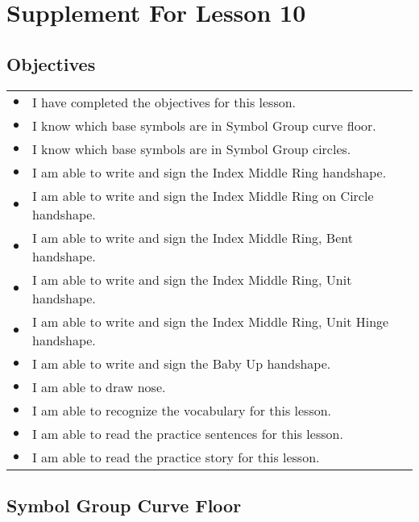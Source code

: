 \documentclass{article}
\begin{document}
\newfontfamily{}
\newfontfamily{}
\newcommand{\bul}{\hfil$\bullet$&}
\renewenvironment{glossary}{\begin{multicols}{5}\begin{center}}{\end{center}\end{multicols}}
\setcounter{secnumdepth}{0}
\setlength{\columnseprule}{1pt}

\section{Supplement For Lesson 10}

\subsection{Objectives}

\begin{tabular}{p{1cm}p{14cm}}
\bul I have completed the objectives for this lesson.\\
\bul I know which base symbols are in Symbol Group curve floor.\\
\bul I know which base symbols are in Symbol Group circles.\\
\bul I am able to write and sign the Index Middle Ring handshape.\\
\bul I am able to write and sign the Index Middle Ring on Circle handshape.\\
\bul I am able to write and sign the Index Middle Ring, Bent handshape.\\
\bul I am able to write and sign the Index Middle Ring, Unit handshape.\\
\bul I am able to write and sign the Index Middle Ring, Unit Hinge handshape.\\
\bul I am able to write and sign the Baby Up handshape.\\
\bul I am able to draw nose.\\
\bul I am able to recognize the vocabulary for this lesson.\\
\bul I am able to read the practice sentences for this lesson.\\
\bul I am able to read the practice story for this lesson.\\
\end{tabular}

\subsection{Symbol Group Curve Floor}
\end{document}
